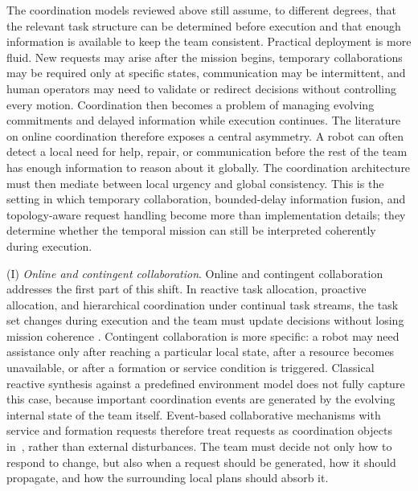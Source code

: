 The coordination models reviewed above still assume, to different degrees, that the
relevant task structure can be determined before execution and that enough information is
available to keep the team consistent. Practical deployment is more fluid. New requests
may arise after the mission begins, temporary collaborations may be required only at
specific states, communication may be intermittent, and human operators may need to
validate or redirect decisions without controlling every motion. Coordination then becomes
a problem of managing evolving commitments and delayed information while execution
continues.
The literature on online coordination therefore exposes a central asymmetry. A robot can
often detect a local need for help, repair, or communication before the rest of the team
has enough information to reason about it globally. The coordination architecture must
then mediate between local urgency and global consistency. This is the setting in which
temporary collaboration, bounded-delay information fusion, and topology-aware request
handling become more than implementation details; they determine whether the temporal
mission can still be interpreted coherently during execution.

 (I) \emph{Online and contingent collaboration}. Online and contingent
collaboration addresses the first part of this shift. In reactive task allocation,
proactive allocation, and hierarchical coordination under continual task streams, the task
set changes during execution and the team must update decisions without losing mission
coherence \citep{chen2025realtime, street2024rightplace, luo2025hulk}. Contingent
collaboration is more specific: a robot may need assistance only after reaching a
particular local state, after a resource becomes unavailable, or after a formation or
service condition is triggered. Classical reactive synthesis against a predefined
environment model \citep{kress2009temporal} does not fully capture this case, because
important coordination events are generated by the evolving internal state of the team
itself. Event-based collaborative mechanisms with service and formation requests
therefore treat requests as coordination objects in~\citet{guo2016graphgrammar}, rather than
external disturbances. The team must decide not only how to respond to change, but also
when a request should be generated, how it should propagate, and how the surrounding local
plans should absorb it.

